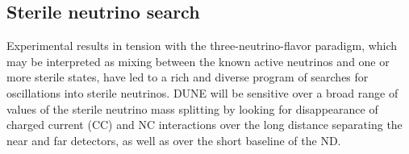 \subsection{Sterile neutrino search}
 Experimental results in tension with the three-neutrino-flavor paradigm, which may be interpreted
 as mixing between the known active neutrinos and one or more sterile states, have led to a rich
 and diverse program of searches for oscillations into sterile neutrinos. DUNE will be sensitive over a
 broad range of values of the sterile neutrino mass splitting by looking for disappearance of charged
 current (CC) and NC interactions over the long distance separating the near and far detectors,
 as well as over the short baseline of the ND. 

